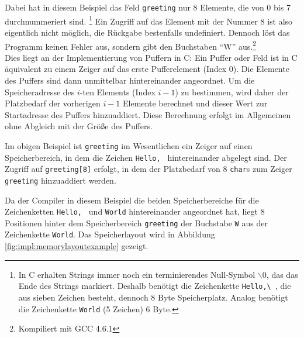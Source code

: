 Dabei hat in diesem Beispiel das Feld \lstinline+greeting+ nur 8 Elemente, die von 0 bis 7 durchnummeriert sind.%
\footnote{In C erhalten Strings immer noch ein terminierendes Null-Symbol $\backslash$0, das das Ende des Strings markiert. Deshalb benötigt die Zeichenkette \lstinline[showspaces=true]+Hello,\ +, die aus sieben Zeichen besteht, dennoch 8 Byte Speicherplatz. Analog benötigt die Zeichenkette \lstinline+World+ (5 Zeichen) 6 Byte.}
Ein Zugriff auf das Element mit der Nummer 8 ist also eigentlich nicht möglich, die Rückgabe bestenfalls undefiniert.
Dennoch löst das Programm keinen Fehler aus, sondern gibt den Buchstaben "`W"' aus.\footnote{Kompiliert mit GCC 4.6.1}\\

Dies liegt an der Implementierung von Puffern in C:
Ein Puffer oder Feld ist in C äquivalent zu einem Zeiger auf das erste Pufferelement (Index 0).
Die Elemente des Puffers sind dann unmittelbar hintereinander angeordnet.
Um die Speicheradresse des $i$-ten Elements (Index $i - 1$) zu bestimmen, wird daher der Platzbedarf der vorherigen $i-1$ Elemente berechnet und dieser Wert zur Startadresse des Puffers hinzuaddiert.
Diese Berechnung erfolgt im Allgemeinen ohne Abgleich mit der Größe des Puffers.

Im obigen Beispiel ist \lstinline+greeting+ im Wesentlichen ein Zeiger auf einen Speicherbereich, in dem die Zeichen \lstinline+Hello, + hintereinander abgelegt sind.
Der Zugriff auf \lstinline+greeting[8]+ erfolgt, in dem der Platzbedarf von 8 \lstinline+char+s zum Zeiger \lstinline+greeting+ hinzuaddiert werden.

Da der Compiler in diesem Beispiel die beiden Speicherbereiche für die Zeichenketten \lstinline+Hello, + und \lstinline+World+ hintereinander angeordnet hat,
liegt 8 Positionen hinter dem Speicherbereich \lstinline+greeting+ der Buchstabe \lstinline+W+ aus der Zeichenkette \lstinline+World+.
Das Speicherlayout wird in Abbildung \ref{fig:impl:memorylayoutexample} gezeigt.

